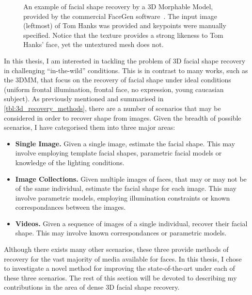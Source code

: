 \begin{figure}[t]
	\hspace*{\fill}
	\caption{An example of facial shape recovery by a 3D Morphable Model, 
	         provided by the commercial FaceGen software~\cite{facegen}. The
	         input image (leftmost) of Tom Hanks was provided and keypoints were
	         manually specified. Notice that the texture provides a strong 
	         likeness to Tom Hanks' face, yet the untextured mesh does not.}
\label{fig:facegen_tom_hanks}
\end{figure}

In this thesis, I am interested in tackling the problem of 3D facial shape
recovery in challenging ``in-the-wild'' conditions. This is in contrast
to many works, such as the 3DMM, that focus on the recovery of facial shape
under ideal conditions (uniform frontal illumination, frontal face,
no expression, young caucasian subject). As previously mentioned and summarised
in \cref{tbl:3d_recovery_methods}, there are 
a number of scenarios that may be considered in order to recover shape from
images. Given the breadth of possible scenarios, I have categorised them into
three major areas:
\begin{itemize}
	\item \textbf{Single Image.} Given a single image, estimate the facial 
	      shape. This may involve employing template facial shapes, parametric
	      facial models or knowledge of the lighting conditions. 
	\item \textbf{Image Collections.} Given multiple images of faces, that may
	      or may not be of the same individual, estimate the facial shape for
	      each image. This may involve parametric models, employing illumination
	      constraints or known correspondances between the images.
	\item \textbf{Videos.} Given a sequence of images of a single individual,
	      recover their facial shape. This may involve known correspondances or
	      parametric models.
\end{itemize}
Although there exists many other scenarios, these three provide methods of
recovery for the vast majority of media available for faces. In this thesis, I
chose to investigate a novel method for improving the state-of-the-art under
each of these three scenarios. The rest of this section will be devoted to
describing my contributions in the area of dense 3D facial shape recovery.
